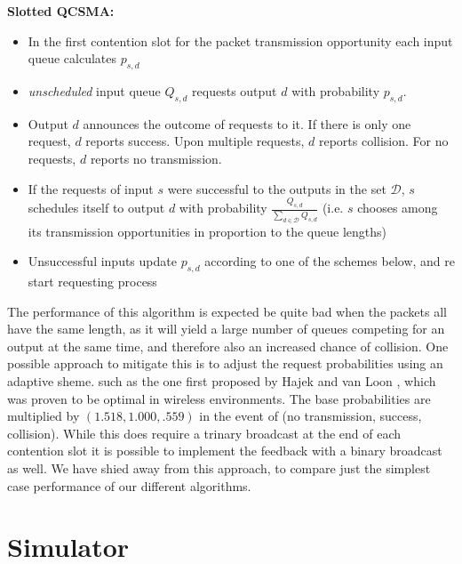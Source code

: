 \documentclass{IEEEtran}%
\begin{document}
{\bf Slotted QCSMA:}
\begin{itemize}
\item In the first contention slot for the packet transmission opportunity each input queue calculates $p_{s,d}$
\item {\it unscheduled} input queue $Q_{s,d}$ requests output $d$ with probability $p_{s,d}$.
\item Output $d$ announces the outcome of requests to it.  If there is only one request, $d$ reports success.  Upon multiple requests, $d$ reports collision. For no requests, $d$ reports no transmission.
\item If the requests of input $s$ were successful to the outputs in the set $\mathcal{D}$, $s$ schedules itself to output $d$ with probability $\frac{Q_{s,d}}{\sum_{d\in \mathcal{D}}Q_{s,d}}$ (i.e. $s$ chooses among its transmission opportunities in proportion to the queue lengths)
\item Unsuccessful inputs update $p_{s,d}$ according to one of the schemes below, and re start requesting process\\
\end{itemize}

The performance of this algorithm is expected be quite bad when the packets all have the same length, as it will yield a large number of queues competing for an output at the same time, and therefore also an increased chance of collision.  One possible approach to mitigate this is to adjust the request probabilities using an adaptive sheme. such as the one first proposed by Hajek and van Loon \cite{Hajek_van_Loon}, which was proven to be optimal in wireless environments.  The base probabilities are multiplied by $(1.518,1.000,.559)$  in the event of (no transmission, success, collision).  While this does require a trinary broadcast at the end of each contention slot it is possible to implement the feedback with a binary broadcast as well.  We have shied away from this approach, to compare just the simplest case performance of our different algorithms.



\section{Simulator}
\end{document}
